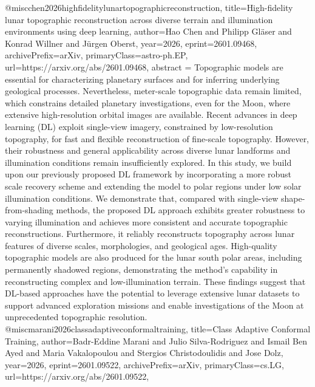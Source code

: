 {}@misc{chen2026highfidelitylunartopographicreconstruction,
      title={High-fidelity lunar topographic reconstruction across diverse terrain and illumination environments using deep learning}, 
      author={Hao Chen and Philipp Gläser and Konrad Willner and Jürgen Oberst},
      year={2026},
      eprint={2601.09468},
      archivePrefix={arXiv},
      primaryClass={astro-ph.EP},
      url={https://arxiv.org/abs/2601.09468},
      abstract = {Topographic models are essential for characterizing planetary surfaces and for inferring underlying geological processes. Nevertheless, meter-scale topographic data remain limited, which constrains detailed planetary investigations, even for the Moon, where extensive high-resolution orbital images are available. Recent advances in deep learning (DL) exploit single-view imagery, constrained by low-resolution topography, for fast and flexible reconstruction of fine-scale topography. However, their robustness and general applicability across diverse lunar landforms and illumination conditions remain insufficiently explored. In this study, we build upon our previously proposed DL framework by incorporating a more robust scale recovery scheme and extending the model to polar regions under low solar illumination conditions. We demonstrate that, compared with single-view shape-from-shading methods, the proposed DL approach exhibits greater robustness to varying illumination and achieves more consistent and accurate topographic reconstructions. Furthermore, it reliably reconstructs topography across lunar features of diverse scales, morphologies, and geological ages. High-quality topographic models are also produced for the lunar south polar areas, including permanently shadowed regions, demonstrating the method's capability in reconstructing complex and low-illumination terrain. These findings suggest that DL-based approaches have the potential to leverage extensive lunar datasets to support advanced exploration missions and enable investigations of the Moon at unprecedented topographic resolution.}
}@misc{marani2026classadaptiveconformaltraining,
      title={Class Adaptive Conformal Training}, 
      author={Badr-Eddine Marani and Julio Silva-Rodriguez and Ismail Ben Ayed and Maria Vakalopoulou and Stergios Christodoulidis and Jose Dolz},
      year={2026},
      eprint={2601.09522},
      archivePrefix={arXiv},
      primaryClass={cs.LG},
      url={https://arxiv.org/abs/2601.09522},
}
